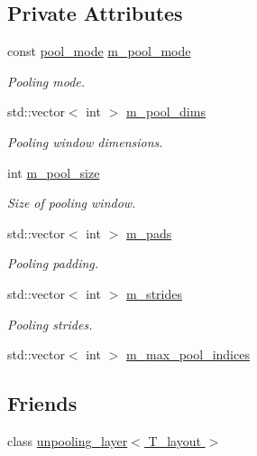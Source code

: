 \subsection*{Private Attributes}
\begin{DoxyCompactItemize}
\item 
const \hyperlink{base_8hpp_ac47a6ee5278a53898222a48639a2bf39}{pool\+\_\+mode} \hyperlink{classlbann_1_1pooling__layer_a7b19407c88f89757e64ed3d4afab8443}{m\+\_\+pool\+\_\+mode}
\begin{DoxyCompactList}\small\item\em Pooling mode. \end{DoxyCompactList}\item 
std\+::vector$<$ int $>$ \hyperlink{classlbann_1_1pooling__layer_abb52fe974f602921823a46320fd7d075}{m\+\_\+pool\+\_\+dims}
\begin{DoxyCompactList}\small\item\em Pooling window dimensions. \end{DoxyCompactList}\item 
int \hyperlink{classlbann_1_1pooling__layer_a8b3a9020bb896a1132c9823bc2c73515}{m\+\_\+pool\+\_\+size}
\begin{DoxyCompactList}\small\item\em Size of pooling window. \end{DoxyCompactList}\item 
std\+::vector$<$ int $>$ \hyperlink{classlbann_1_1pooling__layer_a22fd39aa4358149110a369ddf0e5ffdb}{m\+\_\+pads}
\begin{DoxyCompactList}\small\item\em Pooling padding. \end{DoxyCompactList}\item 
std\+::vector$<$ int $>$ \hyperlink{classlbann_1_1pooling__layer_a754bb6d49b39e915f315ca0049c953d9}{m\+\_\+strides}
\begin{DoxyCompactList}\small\item\em Pooling strides. \end{DoxyCompactList}\item 
std\+::vector$<$ int $>$ \hyperlink{classlbann_1_1pooling__layer_a58683798db4c48175cbad5ec32ff676c}{m\+\_\+max\+\_\+pool\+\_\+indices}
\end{DoxyCompactItemize}
\subsection*{Friends}
\begin{DoxyCompactItemize}
\item 
class \hyperlink{classlbann_1_1pooling__layer_ad56e2530ee19c632a3a06e6214a1889f}{unpooling\+\_\+layer$<$ T\+\_\+layout $>$}
\end{DoxyCompactItemize}
